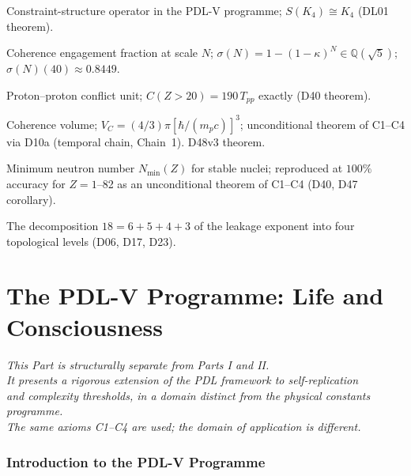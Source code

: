 \documentclass[11pt,a4paper]{article}
\theoremstyle{plain}
\theoremstyle{definition}
\theoremstyle{remark}
\newcommand{\sigmaN}{\sigma(N)}
\newcommand{\Tpp}{T_{pp}}
\begin{document}
\begin{description}[leftmargin=3.5cm, style=nextline]
\item[$S(\Gamma)$] Constraint-structure operator in the PDL-V programme; $S(K_4) \cong K_4$ (DL01 theorem).
\item[$\sigmaN(N)$] Coherence engagement fraction at scale $N$; $\sigmaN=1-(1-\kappa)^N\in\mathbb{Q}(\sqrt{5})$; $\sigmaN(40)\approx 0.8449$.
\item[$\Tpp$] Proton--proton conflict unit; $C(Z>20)=190\,\Tpp$ exactly (D40 theorem).
\item[$V_C$] Coherence volume; $V_C=(4/3)\pi[\hbar/(m_pc)]^3$; unconditional theorem of C1--C4 via D10a (temporal chain, Chain~1). D48v3 theorem.
\item[Valley of stability] Minimum neutron number $N_{\min}(Z)$ for stable nuclei; reproduced at $100\%$ accuracy for $Z=1$--82 as an unconditional theorem of C1--C4 (D40, D47 corollary).
\item[18-filter hierarchy] The decomposition $18=6+5+4+3$ of the leakage exponent into four topological levels (D06, D17, D23).
\end{description}

\newpage
\part{The PDL-V Programme: Life and Consciousness}
\label{part:PDL-V}

\begin{center}
\textit{This Part is structurally separate from Parts I and II.\\
It presents a rigorous extension of the PDL framework to self-replication\\
and complexity thresholds, in a domain distinct from the physical constants programme.\\
The same axioms C1--C4 are used; the domain of application is different.}
\end{center}

\vspace{1em}

\section{Introduction to the PDL-V Programme}
\label{sec:PDLV_intro}
\end{document}
